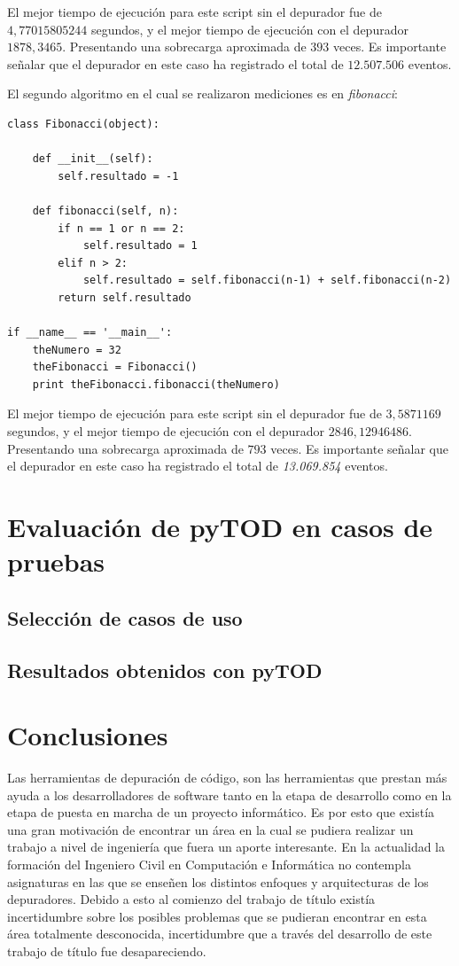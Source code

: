 \documentclass[12pt,legalpaper]{report}
\begin{document}
El mejor tiempo de ejecución para este script sin el depurador fue de $4,77015805244$ segundos, y el mejor tiempo de ejecución con el depurador $1878,3465$.  Presentando una sobrecarga aproximada de $393$ veces. Es importante señalar que el depurador en este caso ha registrado el total de $12.507.506$ eventos.

El segundo algoritmo en el cual se realizaron mediciones es en \textit{fibonacci}:

\begin{singlespace}
\begin{lstlisting}[style=Python]
class Fibonacci(object):
    
    def __init__(self):
        self.resultado = -1
        
    def fibonacci(self, n):
        if n == 1 or n == 2:
            self.resultado = 1
        elif n > 2:
            self.resultado = self.fibonacci(n-1) + self.fibonacci(n-2)
        return self.resultado

if __name__ == '__main__':
    theNumero = 32
    theFibonacci = Fibonacci()
    print theFibonacci.fibonacci(theNumero)
\end{lstlisting}
\end{singlespace}	

El mejor tiempo de ejecución para este script sin el depurador fue de $3,5871169$ segundos, y el mejor tiempo de ejecución con el depurador $2846,12946486$.  Presentando una sobrecarga aproximada de $793$ veces.  Es importante señalar que el depurador en este caso ha registrado el total de \textit{13.069.854} eventos.
	
\chapter{Evaluación de pyTOD en casos de pruebas}
	\section{Selección de casos de uso}
	\section{Resultados obtenidos con pyTOD}
\chapter{Conclusiones}

Las herramientas de depuración de código, son las herramientas que prestan más ayuda a los desarrolladores de software tanto en la etapa de desarrollo como en la etapa de puesta en marcha de un proyecto informático.  Es por esto que existía una gran motivación de encontrar un área en la cual se pudiera realizar un trabajo a nivel de ingeniería que fuera un aporte interesante.  En la actualidad la formación del Ingeniero Civil en Computación e Informática no contempla asignaturas en las que se enseñen los distintos enfoques y arquitecturas de los depuradores.  Debido a esto al comienzo del trabajo de título existía incertidumbre sobre los posibles problemas que se pudieran encontrar en esta área totalmente desconocida, incertidumbre que a través del desarrollo de este trabajo de título fue desapareciendo.
\end{document}
